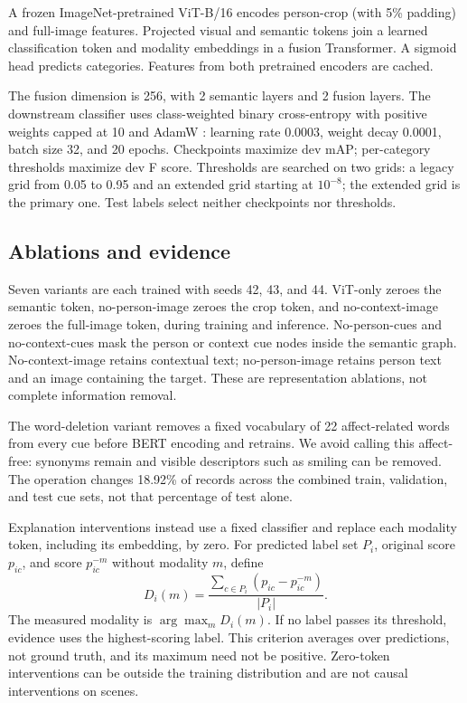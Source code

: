 \documentclass[conference]{IEEEtran}
\newcommand{\ev}[2]{#2}
\begin{document}
A frozen ImageNet-pretrained \ev{vit}{ViT-B/16} \cite{vit} encodes person-crop (with 5\% padding) and full-image features. Projected visual and semantic tokens join a learned classification token and modality embeddings in a fusion Transformer. A sigmoid head predicts categories. Features from both pretrained encoders are cached.

The fusion dimension is \ev{fusion-dim}{256}, with \ev{graph-layers}{2} semantic layers and \ev{fusion-layers}{2} fusion layers. The downstream classifier uses class-weighted binary cross-entropy with positive weights capped at 10 and AdamW \cite{adamw}: learning rate \ev{lr}{0.0003}, weight decay \ev{weight-decay}{0.0001}, batch size \ev{batch-size}{32}, and \ev{epochs}{20} epochs. Checkpoints maximize dev mAP; per-category thresholds maximize dev F score. Thresholds are searched on two grids: a legacy grid from 0.05 to 0.95 and an extended grid starting at $10^{-8}$; the extended grid is the primary one. Test labels select neither checkpoints nor thresholds.

\subsection{Ablations and evidence}
Seven variants are each trained with seeds 42, 43, and 44. ViT-only zeroes the semantic token, no-person-image zeroes the crop token, and no-context-image zeroes the full-image token, during training and inference. No-person-cues and no-context-cues mask the person or context cue nodes inside the semantic graph. No-context-image retains contextual text; no-person-image retains person text and an image containing the target. These are representation ablations, not complete information removal.

The word-deletion variant removes a fixed vocabulary of \ev{affect-words}{22} affect-related words from every cue before BERT encoding and retrains. We avoid calling this affect-free: synonyms remain and visible descriptors such as smiling can be removed. The operation changes \ev{affect-changed}{18.92}\% of records across the combined train, validation, and test cue sets, not that percentage of test alone.

Explanation interventions instead use a fixed classifier and replace each modality token, including its embedding, by zero. For predicted label set $P_i$, original score $p_{ic}$, and score $p_{ic}^{-m}$ without modality $m$, define
\begin{equation}
D_i(m)=\frac{\sum_{c\in P_i}(p_{ic}-p_{ic}^{-m})}{|P_i|}.
\end{equation}
The measured modality is $\arg\max_m D_i(m)$. If no label passes its threshold, evidence uses the highest-scoring label. This criterion averages over predictions, not ground truth, and its maximum need not be positive. Zero-token interventions can be outside the training distribution and are not causal interventions on scenes.
\end{document}
